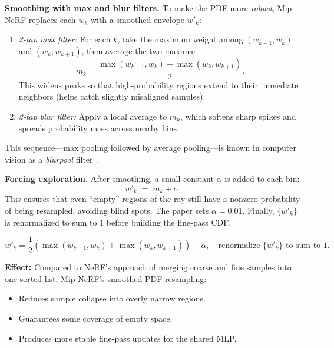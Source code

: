 \begin{enrichment}
\begin{enrichment}
    \medskip
    \noindent
    \textbf{Smoothing with max and blur filters.}  
    To make the PDF more \emph{robust}, Mip-NeRF replaces each $w_k$ with a smoothed envelope $w'_k$:
    \begin{enumerate}
        \item \emph{2-tap max filter:}  
        For each $k$, take the maximum weight among $(w_{k-1}, w_k)$ and $(w_k, w_{k+1})$, then average the two maxima:
        \[
        m_k = \frac{\max(w_{k-1}, w_k) + \max(w_k, w_{k+1})}{2}.
        \]
        This widens peaks so that high-probability regions extend to their immediate neighbors (helps catch slightly misaligned samples).
        \item \emph{2-tap blur filter:}  
        Apply a local average to $m_k$, which softens sharp spikes and spreads probability mass across nearby bins.
    \end{enumerate}
    This sequence—max pooling followed by average pooling—is known in computer vision as a \emph{blurpool} filter~\cite{zhang2019_blurpool}.
    
    \medskip
    \noindent
    \textbf{Forcing exploration.}  
    After smoothing, a small constant $\alpha$ is added to each bin:
    \[
    w'_k \;=\; m_k + \alpha.
    \]
    This ensures that even “empty” regions of the ray still have a nonzero probability of being resampled, avoiding blind spots. The paper sets $\alpha=0.01$. Finally, $\{w'_k\}$ is renormalized to sum to 1 before building the fine-pass CDF.
    
    \begin{equation}
        w'_k
        = \frac{1}{2}\!\left(\max(w_{k-1}, w_k) + \max(w_k, w_{k+1})\right) + \alpha,
        \quad
        \text{renormalize }\{w'_k\} \text{ to sum to } 1.
        \label{eq:chapter23_mipnerf_blurpool_pdf}
    \end{equation}
    
    \medskip
    \noindent
    \textbf{Effect:}  
    Compared to NeRF’s approach of merging coarse and fine samples into one sorted list, Mip-NeRF’s smoothed-PDF resampling:
    \begin{itemize}
        \item Reduces sample collapse into overly narrow regions.
        \item Guarantees some coverage of empty space.
        \item Produces more stable fine-pass updates for the shared MLP.
    \end{itemize}
    

\end{enrichment}
\end{enrichment}
